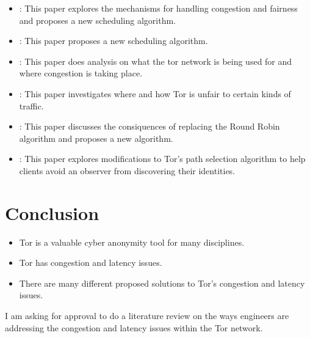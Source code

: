 \documentclass[letterpaper,12pt]{texMemo}
\begin{document}
\begin{itemize}
    \item
    \citeauthor{unfair}: This paper explores the mechanisms for handling congestion
    and fairness and proposes a new scheduling algorithm.
    \item
    \citeauthor{Tang}: This paper proposes a new scheduling algorithm.
    \item
    \citeauthor{analysis}: This paper does analysis on what the tor network is being used for and where congestion is taking place.
    \item
    \citeauthor{delay}: This paper investigates where and how Tor is unfair to certain kinds of traffic.
    \item
    \citeauthor{Bauer}: This paper discusses the consiquences of replacing the Round Robin algorithm and
    proposes a new algorithm.
    \item
    \citeauthor{Edman}: This paper explores modifications to Tor's path selection algorithm to help
    clients avoid an observer from discovering their identities.
\end{itemize}


\section*{Conclusion}
\begin{itemize}
    \item
    Tor is a valuable cyber anonymity tool for many disciplines.
    \item
    Tor has congestion and latency issues.
    \item
    There are many different proposed solutions to Tor's congestion and latency issues.
\end{itemize}
I am asking for approval to do a literature review on the ways engineers are addressing the
congestion and latency issues within the Tor network.



\end{document}
